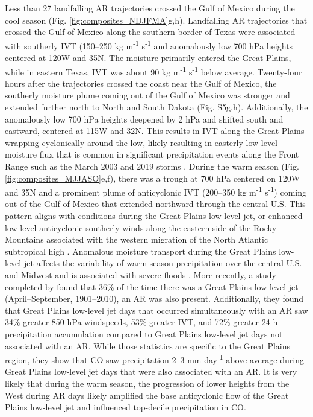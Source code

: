 \documentclass[draft]{agujournal2019}
\begin{document}
Less than 27 landfalling AR trajectories crossed the Gulf of Mexico during the cool season (Fig. \ref{fig:composites_NDJFMA}g,h). Landfalling AR trajectories that crossed the Gulf of Mexico along the southern border of Texas were associated with southerly IVT (150--250 kg m\textsuperscript{-1} s\textsuperscript{-1} and anomalously low 700 hPa heights centered at 120\textdegree W and 35\textdegree N. The moisture primarily entered the Great Plains, while in eastern Texas, IVT was about 90 kg m\textsuperscript{-1} s\textsuperscript{-1} below average. Twenty-four hours after the trajectories crossed the coast near the Gulf of Mexico, the southerly moisture plume coming out of the Gulf of Mexico was stronger and extended further north to North and South Dakota (Fig. S5g,h). Additionally, the anomalously low 700 hPa heights deepened by 2 hPa and shifted south and eastward, centered at 115\textdegree W and 32\textdegree N. This results in IVT along the Great Plains wrapping cyclonically around the low, likely resulting in easterly low-level moisture flux that is common in significant precipitation events along the Front Range such as the March 2003 and 2019 storms \cite{Wesley2013Extreme2003, Zou2024A2019}. During the warm season (Fig. \ref{fig:composites_MJJASO}e,f), there was a trough at 700 hPa centered on 120\textdegree W and 35\textdegree N and a prominent plume of anticyclonic IVT (200--350 kg m\textsuperscript{-1} s\textsuperscript{-1}) coming out of the Gulf of Mexico that extended northward through the central U.S. This pattern aligns with conditions during the Great Plains low-level jet, or enhanced low-level anticyclonic southerly winds along the eastern side of the Rocky Mountains associated with the western migration of the North Atlantic subtropical high \cite{Zhou2021FutureHigh}. Anomalous moisture transport during the Great Plains low-level jet affects the variability of warm-season precipitation over the central U.S. and Midwest \cite{Pu2016DynamicalPrecipitation, Helfand1995ClimatologyStates, Weaver2008VariabilityImpacts, Schubert1998SubseasonalStates} and is associated with severe floods \cite{Mo1997AtmosphericStates, Weaver2009PentadBalance}. More recently, a study completed by  found that 36\% of the time there was a Great Plains low-level jet (April--September, 1901--2010), an AR was also present. Additionally, they found that Great Plains low-level jet days that occurred simultaneously with an AR saw 34\% greater 850 hPa windspeeds, 53\% greater IVT, and 72\% greater 24-h precipitation accumulation compared to Great Plains low-level jet days not associated with an AR. While those statistics are specific to the Great Plains region, they show that CO saw precipitation 2--3 mm day\textsuperscript{-1} above average during Great Plains low-level jet days that were also associated with an AR. It is very likely that during the warm season, the progression of lower heights from the West during AR days likely amplified the base anticyclonic flow of the Great Plains low-level jet and influenced top-decile precipitation in CO. 
\end{document}
